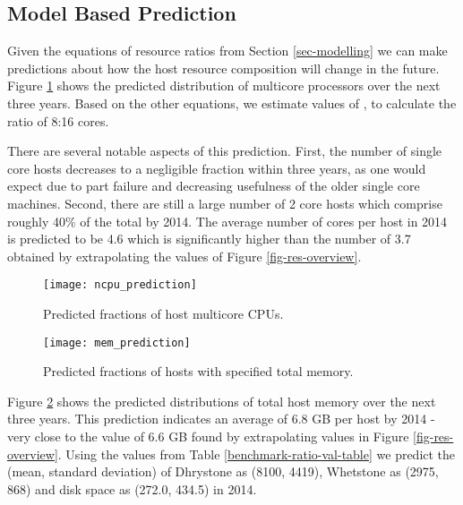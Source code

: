 \documentclass[conference]{IEEEtran}
\begin{document}
\subsection{Model Based Prediction}
Given the equations of resource ratios from Section \ref{sec-modelling} we can make predictions about how the host resource composition will change in the future.  Figure \ref{fig-ncpu-prediction} shows the predicted distribution of multicore processors over the next three years.  Based on the other equations, we estimate values of ,  to calculate the ratio of 8:16 cores.

There are several notable aspects of this prediction.  First, the number of single core hosts decreases to a negligible fraction within three years, as one would expect due to part failure and decreasing usefulness of the older single core machines.  Second, there are still a large number of 2 core hosts which comprise roughly 40\% of the total by 2014.  The average number of cores per host in 2014 is predicted to be 4.6 which is significantly higher than the number of 3.7 obtained by extrapolating the values of Figure \ref{fig-res-overview}.

\begin{figure}[!t]
\centering
\texttt{[image: ncpu\_prediction]}
\caption{Predicted fractions of host multicore CPUs.}
\label{fig-ncpu-prediction}
\end{figure}

\begin{figure}[!t]
\centering
\texttt{[image: mem\_prediction]}
\caption{Predicted fractions of hosts with specified total memory.}
\label{fig-mem-prediction}
\end{figure}

Figure \ref{fig-mem-prediction} shows the predicted distributions of total host memory over the next three years.  This prediction indicates an average of 6.8 GB per host by 2014 - very close to the value of 6.6 GB found by extrapolating values in Figure \ref{fig-res-overview}.  Using the values from Table \ref{benchmark-ratio-val-table} we predict the (mean, standard deviation) of Dhrystone as (8100, 4419), Whetstone as (2975, 868) and disk space as (272.0, 434.5) in 2014.

\end{document}
